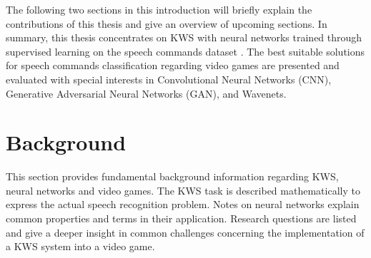 The following two sections in this introduction will briefly explain the contributions of this thesis and give an overview of upcoming sections.
In summary, this thesis concentrates on KWS with neural networks trained through supervised learning on the speech commands dataset \cite{Warden2018}.
The best suitable solutions for speech commands classification regarding video games are presented and evaluated with special interests in Convolutional Neural Networks (CNN), Generative Adversarial Neural Networks (GAN), and Wavenets.







\chapter{Background}\label{sec:back}
This section provides fundamental background information regarding KWS, neural networks and video games.
The KWS task is described mathematically to express the actual speech recognition problem.
Notes on neural networks explain common properties and terms in their application.
Research questions are listed and give a deeper insight in common challenges concerning the implementation of a KWS system into a video game.





